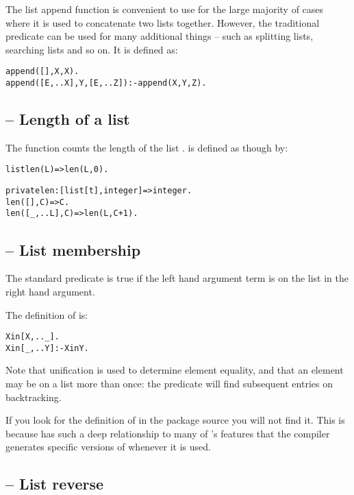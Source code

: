 The \q{<>} list append function is convenient to use for the large majority of cases where it is used to concatenate two lists together. However, the traditional \prolog {} predicate can be used for many additional things -- such as splitting lists, searching lists and so on. It is defined as:
\begin{alltt}
append([],X,X).
append([E,..X],Y,[E,..Z]):-append(X,Y,Z).
\end{alltt}

\subsection{ -- Length of a list}
\label{stdlib:listlen}

The  function counts the length of the list .  is defined as though by:
\begin{alltt}
listlen(L) => len(L,0).

private len:[list[t],integer]=>integer.
len([],C) => C.
len([\_,..L],C) => len(L,C+1).
\end{alltt}

\subsection{ -- List membership}
\label{stdlib:in}

The  standard predicate is true if the left hand argument term is on the list in the right hand argument.

The definition of  is:
\begin{alltt}
X in [X,..\_].
X in [\_,..Y] :- X in Y.
\end{alltt}
Note that unification is used to determine element equality, and that an element may be on a list more than once: the  predicate will find subsequent entries on backtracking.
\begin{aside}
If you look for the definition of  in the  package source you will not find it. This is because  has such a deep relationship to many of \go's features that the compiler generates specific versions of  whenever it is used.
\end{aside}

\subsection{ -- List reverse}
\label{stdlib:rev}

